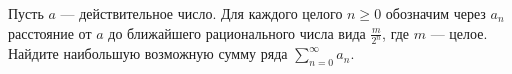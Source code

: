\documentclass{article}
\begin{document}
Пусть $a$ --- действительное число. Для каждого целого $n \geqslant 0$ обозначим через $a_n$ расстояние от $a$ до ближайшего 
рационального числа вида $\frac{m}{2^n}$, где $m$ --- целое. Найдите наибольшую возможную сумму ряда $\sum\limits_{n=0}^\infty a_n$.
\end{document}
